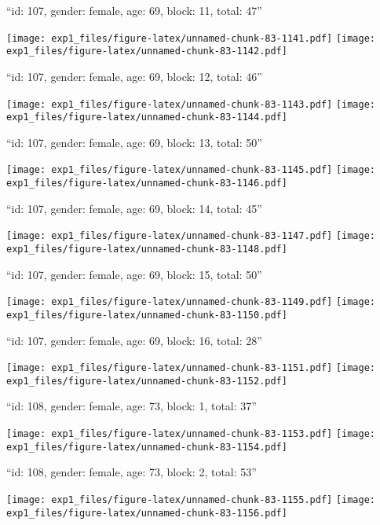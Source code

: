 \documentclass[11pt,,]{article}
\begin{document}
\newpage
[1] 

``id: 107, gender: female, age: 69, block: 11, total: 47''

\texttt{[image: exp1\_files/figure-latex/unnamed-chunk-83-1141.pdf]}
\texttt{[image: exp1\_files/figure-latex/unnamed-chunk-83-1142.pdf]}

\newpage
[1] 

``id: 107, gender: female, age: 69, block: 12, total: 46''

\texttt{[image: exp1\_files/figure-latex/unnamed-chunk-83-1143.pdf]}
\texttt{[image: exp1\_files/figure-latex/unnamed-chunk-83-1144.pdf]}

\newpage
[1] 

``id: 107, gender: female, age: 69, block: 13, total: 50''

\texttt{[image: exp1\_files/figure-latex/unnamed-chunk-83-1145.pdf]}
\texttt{[image: exp1\_files/figure-latex/unnamed-chunk-83-1146.pdf]}

\newpage
[1] 

``id: 107, gender: female, age: 69, block: 14, total: 45''

\texttt{[image: exp1\_files/figure-latex/unnamed-chunk-83-1147.pdf]}
\texttt{[image: exp1\_files/figure-latex/unnamed-chunk-83-1148.pdf]}

\newpage
[1] 

``id: 107, gender: female, age: 69, block: 15, total: 50''

\texttt{[image: exp1\_files/figure-latex/unnamed-chunk-83-1149.pdf]}
\texttt{[image: exp1\_files/figure-latex/unnamed-chunk-83-1150.pdf]}

\newpage
[1] 

``id: 107, gender: female, age: 69, block: 16, total: 28''

\texttt{[image: exp1\_files/figure-latex/unnamed-chunk-83-1151.pdf]}
\texttt{[image: exp1\_files/figure-latex/unnamed-chunk-83-1152.pdf]}

\newpage
[1] 

``id: 108, gender: female, age: 73, block: 1, total: 37''

\texttt{[image: exp1\_files/figure-latex/unnamed-chunk-83-1153.pdf]}
\texttt{[image: exp1\_files/figure-latex/unnamed-chunk-83-1154.pdf]}

\newpage
[1] 

``id: 108, gender: female, age: 73, block: 2, total: 53''

\texttt{[image: exp1\_files/figure-latex/unnamed-chunk-83-1155.pdf]}
\texttt{[image: exp1\_files/figure-latex/unnamed-chunk-83-1156.pdf]}
\end{document}
